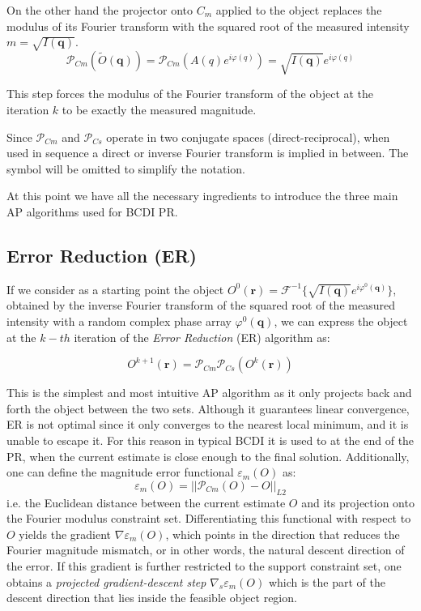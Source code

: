 On the other hand the projector onto $C_m$ applied to the object replaces the modulus of its Fourier transform with the 
squared root of the measured intensity $m = \sqrt{I(\mathbf{q})}$. 
\begin{equation}
    \mathcal{P}_{Cm}(\widetilde{O}(\mathbf{q})) = \mathcal{P}_{Cm}(A(q)e^{i\varphi(q)}) = \sqrt{I(\mathbf{q})}e^{i\varphi(q)}
    \label{eq:modulus_projection}
\end{equation}

This step forces the modulus of the Fourier transform of the object at the iteration $k$ to be exactly the measured magnitude.  

Since $\mathcal{P}_{Cm}$ and $\mathcal{P}_{Cs}$ operate in two conjugate spaces (direct-reciprocal), when used in sequence 
a direct or inverse Fourier transform is implied in between. The symbol will be omitted to simplify the notation. 

At this point we have all the necessary ingredients to introduce the three main AP algorithms used for BCDI PR. 

\subsection{Error Reduction (ER)}

If we consider as a starting point the object $O^0(\mathbf{r}) = \mathcal{F}^{-1}\{ \sqrt{I(\mathbf{q})}e^{i\varphi^0(\mathbf{q})}\}$, obtained by 
the inverse Fourier transform of the squared root of the measured intensity with a random complex phase array $\varphi^0(\mathbf{q})$, 
we can express the object at the $k-th$ iteration of the \textit{Error Reduction} (ER) algorithm as: 

\begin{equation}
    O^{k+1}(\mathbf{r}) = \mathcal{P}_{Cm}\mathcal{P}_{Cs}(O^{k}(\mathbf{r}))
    \label{eq:ER}
\end{equation}

This is the simplest and most intuitive AP algorithm as it only projects back and forth the object between the two sets. 
Although it guarantees linear convergence, ER is not optimal since it only converges to the nearest local minimum, and it is unable 
to escape it. For this reason in typical BCDI it is used to at the end of the PR, when the current estimate is close enough 
to the final solution.
Additionally, one can define the magnitude error functional $\varepsilon_m(O)$ as: 
\begin{equation}
    \varepsilon_m(O) = || \mathcal{P}_{Cm}(O)  - O ||_{L2} 
    \label{eq:error_magnitude}
\end{equation}
i.e. the Euclidean distance between the current estimate $O$ and its projection onto the Fourier modulus constraint set. 
Differentiating this functional with respect to $O$ yields the gradient $\nabla \varepsilon_m(O)$, which points in the 
direction that reduces the Fourier magnitude mismatch, or in other words, the natural descent direction of the error.
If this gradient is further restricted to the support constraint set, one obtains a 
\textit{projected gradient-descent step} $\nabla_s \varepsilon_m(O)$ which is the part of the descent direction that 
lies inside the feasible object region.


